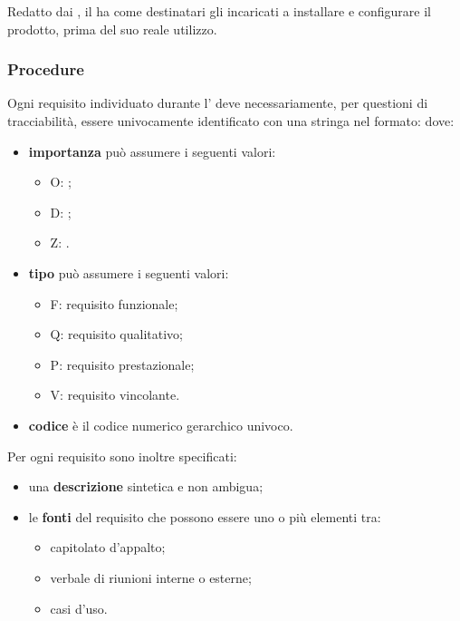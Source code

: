 \documentclass[a4paper, titlepage]{article}
\begin{document}
Redatto dai , il  ha come destinatari gli incaricati a installare e configurare il prodotto, prima del suo reale utilizzo.

\subsubsection{Procedure}
Ogni requisito individuato durante l' deve necessariamente, per questioni di tracciabilità, essere univocamente identificato con una stringa nel formato:
dove:
\begin{itemize}
\item \textbf{importanza} può assumere i seguenti valori:
	\begin{itemize}
	\item O: ;
	\item D: ;
	\item Z: .
	\end{itemize}
\item \textbf{tipo} può assumere i seguenti valori:
	\begin{itemize}
	\item F: requisito funzionale;
	\item Q: requisito qualitativo;
	\item P: requisito prestazionale;
	\item V: requisito vincolante.
	\end{itemize}
\item \textbf{codice} è il codice numerico gerarchico univoco.
\end{itemize}

Per ogni requisito sono inoltre specificati:
\begin{itemize}
\item una \textbf{descrizione} sintetica e non ambigua;
\item le \textbf{fonti} del requisito che possono essere uno o più elementi tra:
	\begin{itemize}
	\item capitolato d'appalto;
	\item verbale di riunioni interne o esterne;
	\item casi d'uso.
	\end{itemize}
\end{itemize}
\end{document}

